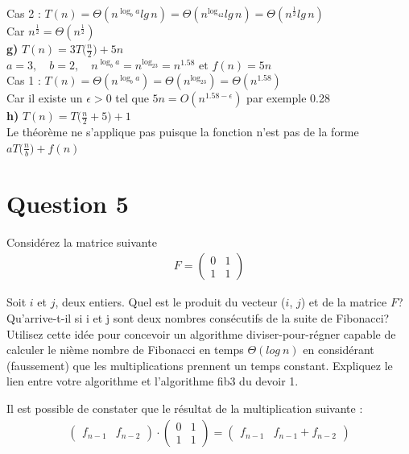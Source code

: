 \documentclass[12pt]{article}
\begin{document}
Cas 2 : \(T(n) = \Theta(n^{\log_ba}lg \, n) = \Theta(n^{\log_42}lg \, n) = \Theta(n^{\frac{1}{2}}lg \, n) \) \\

Car \(n^{\frac{1}{2}} = \Theta(n^{\frac{1}{2}}) \) \\

\textbf{g) } \(T(n)=3T\big(\frac{n}{2}\big)+5n\) \\

\(a=3, \quad b=2, \quad n^{\log_ba} = n^{\log_23}=n^{1.58} \text{ et } f(n) = 5n\) \\

Cas 1 : \(T(n) = \Theta(n^{\log_ba}) = \Theta(n^{\log_23}) = \Theta(n^{1.58}) \) \\

Car il existe un \(\epsilon>0\) tel que \(5n = O(n^{1.58-\epsilon}) \) par exemple 0.28 \\

\textbf{h) } \(T(n)=T\big(\frac{n}{2}+5\big)+1\) \\

Le théorème ne s'applique pas puisque la fonction n'est pas de la forme \(aT \big(\frac{n}{b} \big) +f(n)\)

\newpage

\section*{Question 5}
Considérez la matrice suivante
\begin{align*}
	F =
	\begin{pmatrix}
		0 & 1 \\
		1 & 1
	\end{pmatrix}
\end{align*}

Soit \(i\) et \(j\), deux entiers. Quel est le produit du vecteur (\(i\), \(j\)) et de la matrice \(F\)? Qu’arrive-t-il si i et j sont deux nombres consécutifs de la suite de Fibonacci? Utilisez cette idée pour concevoir un algorithme diviser-pour-régner capable de calculer le nième nombre de Fibonacci en temps \(\Theta (log \: n)\) en considérant (faussement) que les multiplications prennent un temps constant. Expliquez le lien entre votre algorithme et l’algorithme fib3 du devoir 1. \newline

Il est possible de constater que le résultat de la multiplication suivante :
\begin{align*}
	\begin{pmatrix}
		f_{n-1} & f_{n-2}
	\end{pmatrix}
	\cdot
	\begin{pmatrix}
		0 & 1 \\
		1 & 1
	\end{pmatrix}
	=
	\begin{pmatrix}
		f_{n-1} & f_{n-1} + f_{n-2}
	\end{pmatrix}
\end{align*}
\end{document}
